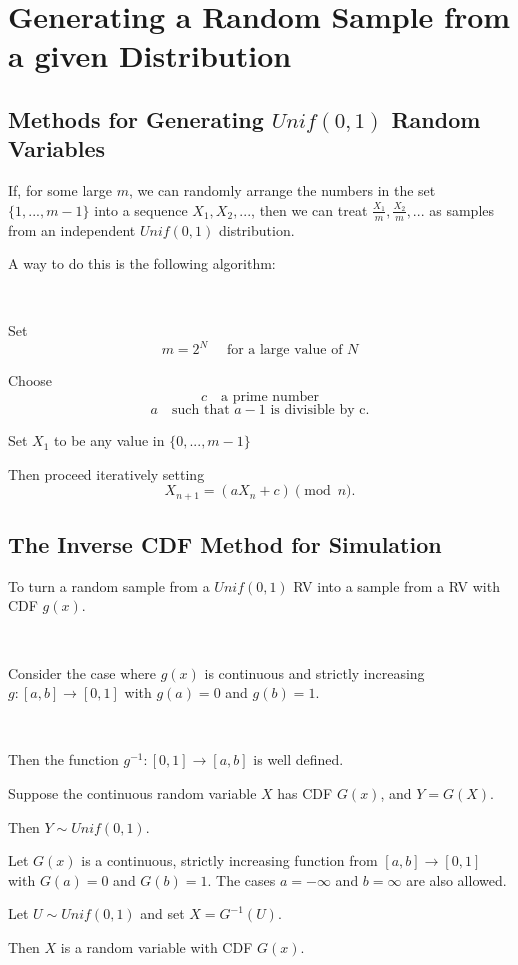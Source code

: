 \section{Generating a Random Sample from a given Distribution}

\subsection{Methods for Generating $Unif(0,1)$ Random Variables}

If, for some large $m$, we can randomly arrange the numbers in the set $\{1,...,m - 1\}$ into a sequence $X_1, X_2, ...$, then we can treat $\frac{X_1}{m}, \frac{X_2}{m},... $ as samples from an independent $Unif(0,1)$ distribution.

\begin{example}
    
A way to do this is the following algorithm:

$ $

Set 
\[m = 2^N \quad \text{ for a large value of } N\]

Choose
\[c \quad \text{a prime number}\]
\[a \quad \text{such that } a - 1 \text{ is divisible by c}.\]

Set $X_1$ to be any value in $\{0,...,m -1 \}$

Then proceed iteratively setting
\[X_{n+1} = (aX_n + c) \pmod n.\]

\end{example}

\subsection{The Inverse CDF Method for Simulation}

To turn a random sample from a $Unif(0,1)$ RV into a sample from a RV with CDF $g(x)$.

$ $

Consider the case where $g(x)$ is continuous and strictly increasing $g : [a, b] \rightarrow [0, 1]$ with $g(a) = 0$ and $g(b) = 1$.

$ $

Then the function $g^{-1} : [0, 1] \rightarrow [a, b]$ is well defined.

\begin{lemma}
  Suppose the continuous random variable $X$ has CDF $G(x)$, and $Y = G(X)$.

    Then $Y \sim Unif(0,1)$.
\end{lemma} 

\begin{theorem}
  Let $G(x)$ is a continuous, strictly increasing function from $[a, b] \rightarrow [0,1]$ with $G(a) = 0$ and $G(b) = 1$. The cases $a = - \infty$ and $b = \infty$ are also allowed.

  Let $U \sim Unif(0,1)$ and set $X = G^{-1}(U)$.

  Then $X$ is a random variable with CDF $G(x)$.
\end{theorem} 
